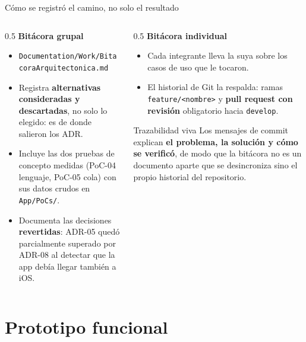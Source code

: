 \documentclass[aspectratio=169,10pt,xcolor={table}]{beamer}
\begin{document}
\begin{frame}{Cómo se registró el camino, no solo el resultado}
  \begin{columns}[T]
    \begin{column}{0.5\textwidth}
      \textbf{Bitácora grupal}
      \begin{itemize}\small
        \item \texttt{Documentation/Work/BitacoraArquitectonica.md}
        \item Registra \textbf{alternativas consideradas y descartadas}, no solo lo elegido:
              es de donde salieron los ADR.
        \item Incluye las dos pruebas de concepto medidas (PoC-04 lenguaje, PoC-05 cola) con sus
              datos crudos en \texttt{App/PoCs/}.
        \item Documenta las decisiones \textbf{revertidas}: ADR-05 quedó parcialmente superado por
              ADR-08 al detectar que la app debía llegar también a iOS.
      \end{itemize}
    \end{column}
    \begin{column}{0.5\textwidth}
      \textbf{Bitácora individual}
      \begin{itemize}\small
        \item Cada integrante lleva la suya sobre los casos de uso que le tocaron.
        \item El historial de Git la respalda: ramas
              \texttt{feature/<nombre>} y \textbf{pull request con revisión} obligatorio hacia
              \texttt{develop}.
      \end{itemize}
      \vspace{0.5em}
      \begin{block}{Trazabilidad viva}
        \small Los mensajes de commit explican \textbf{el problema, la solución y cómo se
        verificó}, de modo que la bitácora no es un documento aparte que se desincroniza sino
        el propio historial del repositorio.
      \end{block}
    \end{column}
  \end{columns}
\end{frame}

\section{Prototipo funcional}
\end{document}

